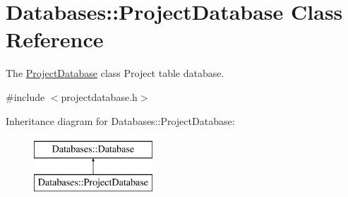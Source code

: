 \hypertarget{classDatabases_1_1ProjectDatabase}{\section{Databases\-:\-:Project\-Database Class Reference}
\label{classDatabases_1_1ProjectDatabase}
}


The \hyperlink{classDatabases_1_1ProjectDatabase}{Project\-Database} class Project table database.  




{\ttfamily \#include $<$projectdatabase.\-h$>$}

Inheritance diagram for Databases\-:\-:Project\-Database\-:\begin{figure}[H]
\begin{center}
\leavevmode
\includegraphics[height=2.000000cm]{d7/d39/classDatabases_1_1ProjectDatabase}
\end{center}
\end{figure}
